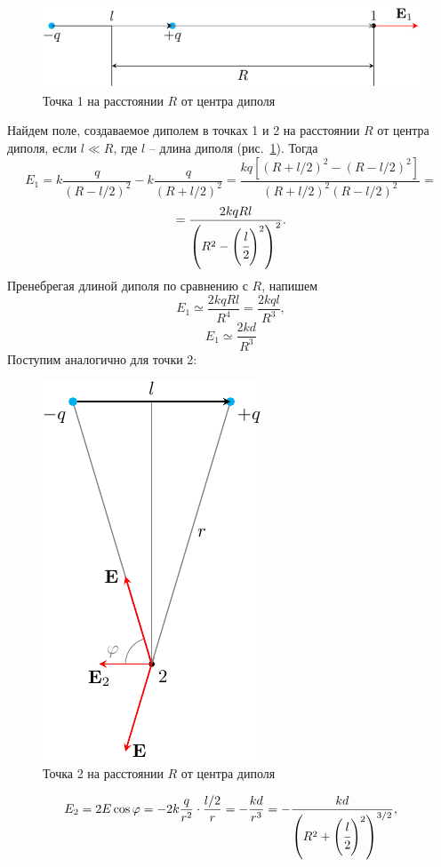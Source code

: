 		\begin{figure}[h!]
			\label{fig:dipole4}
			\centering
			\includegraphics[scale=1.25]{./img/dipole4/dipole4.pdf}
			\caption{Точка 1 на расстоянии $R$ от центра диполя}
		\end{figure}
		Найдем поле, создаваемое диполем в точках 1 и 2 на расстоянии $R$ от центра диполя, если $l\ll R$, где $l$ -- длина диполя (рис.~\ref{fig:dipole4}). Тогда
			$$E_1=k\frac{q}{(R-l/2)^2}-k\frac{q}{(R+l/2)^2}=\frac{kq\left[(R+l/2)^2-(R-l/2)^2\right]}{(R+l/2)^2(R-l/2)^2}=$$
			$$=\frac{2kqRl}{\left(R^2-\left(\cfrac{l}{2}\right)^2\right)^2}.$$
		Пренебрегая длиной диполя по сравнению с $R$, напишем
			$$E_1\simeq\frac{2kqRl}{R^4}=\frac{2kql}{R^3},$$
		\begin{equation}
			E_1\simeq\frac{2kd}{R^3}
		\end{equation}
		Поступим аналогично для точки 2:
		\begin{figure}
			\includegraphics[scale=1.25]{./img/dipole5/dipole5.pdf}
			\caption{Точка 2 на расстоянии $R$ от центра диполя}
		\end{figure}
			$$E_2=2E\cos{\varphi}=-2k\frac{q}{r^2}\cdot\frac{l/2}{r}=-\frac{kd}{r^3}=-\frac{kd}{\left(R^2+\left(\cfrac{l}{2}\right)^2\right)^{3/2}},$$
